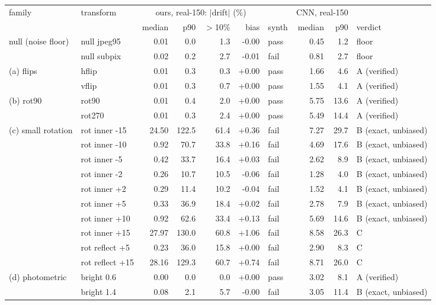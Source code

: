 \begin{tabular}{llrrrrlrrl}
\toprule
family & transform & \multicolumn{4}{c}{ours, real-150: $|$drift$|$ (\%)} & & \multicolumn{2}{c}{CNN, real-150} & \\
 & & median & p90 & $>$10\% & bias & synth & median & p90 & verdict \\
\midrule
null (noise floor) & null jpeg95 & 0.01 & 0.0 & 1.3 & -0.00 & pass & 0.45 & 1.2 & floor \\
 & null subpix & 0.02 & 0.2 & 2.7 & -0.01 & fail & 0.81 & 2.7 & floor \\
(a) flips & hflip & 0.01 & 0.3 & 0.3 & +0.00 & pass & 1.66 & 4.6 & A (verified) \\
 & vflip & 0.01 & 0.3 & 0.7 & +0.00 & pass & 1.55 & 4.1 & A (verified) \\
(b) rot90 & rot90 & 0.01 & 0.4 & 2.0 & +0.00 & pass & 5.75 & 13.6 & A (verified) \\
 & rot270 & 0.01 & 0.3 & 2.4 & +0.00 & pass & 5.49 & 14.4 & A (verified) \\
(c) small rotation & rot inner -15 & 24.50 & 122.5 & 61.4 & +0.36 & fail & 7.27 & 29.7 & B (exact, unbiased) \\
 & rot inner -10 & 0.92 & 70.7 & 33.8 & +0.16 & fail & 4.69 & 17.6 & B (exact, unbiased) \\
 & rot inner -5 & 0.42 & 33.7 & 16.4 & +0.03 & fail & 2.62 & 8.9 & B (exact, unbiased) \\
 & rot inner -2 & 0.26 & 10.7 & 10.5 & -0.06 & fail & 1.28 & 4.0 & B (exact, unbiased) \\
 & rot inner +2 & 0.29 & 11.4 & 10.2 & -0.04 & fail & 1.52 & 4.1 & B (exact, unbiased) \\
 & rot inner +5 & 0.33 & 36.9 & 18.4 & +0.02 & fail & 2.78 & 7.9 & B (exact, unbiased) \\
 & rot inner +10 & 0.92 & 62.6 & 33.4 & +0.13 & fail & 5.69 & 14.6 & B (exact, unbiased) \\
 & rot inner +15 & 27.97 & 130.0 & 60.8 & +1.06 & fail & 8.58 & 26.3 & C \\
 & rot reflect +5 & 0.23 & 36.0 & 15.8 & +0.00 & fail & 2.90 & 8.3 & C \\
 & rot reflect +15 & 28.16 & 129.3 & 60.7 & +0.74 & fail & 8.71 & 26.0 & C \\
(d) photometric & bright 0.6 & 0.00 & 0.0 & 0.0 & +0.00 & pass & 3.02 & 8.1 & A (verified) \\
 & bright 1.4 & 0.08 & 2.1 & 5.7 & -0.00 & fail & 3.05 & 11.4 & B (exact, unbiased) \\

\end{tabular}
